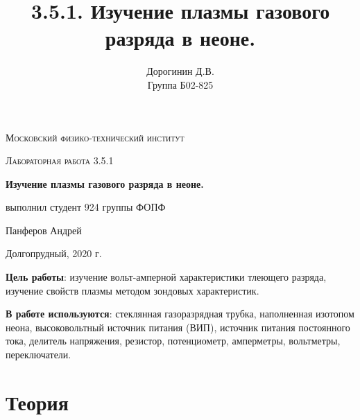 \documentclass[a4paper,12pt]{article}
\author{Дорогинин Д.В.\\
Группа Б02-825}
\title{3.5.1. Изучение плазмы газового разряда в неоне.}
\date{}
\begin{document}
\begin{titlepage}
	\centering
	\vspace{5cm}
	{\scshape\LARGE Московский физико-технический институт \par}
	\vspace{4cm}
	{\scshape\Large Лабораторная работа 3.5.1 \par}
	\vspace{1cm}
	{\huge\bfseries Изучение плазмы газового разряда в неоне. \par}
	\vspace{1cm}
	\vfill
\begin{flushright}
	{\large выполнил студент 924 группы ФОПФ}\par
	\vspace{0.3cm}
	{\LARGE Панферов Андрей}
\end{flushright}
	

	\vfill

	Долгопрудный, 2020 г.
\end{titlepage}

\textbf{Цель работы}: изучение вольт-амперной характеристики тлеющего разряда, изучение свойств плазмы методом зондовых характеристик.


\textbf{В работе используются}: стеклянная газоразрядная трубка, наполненная изотопом неона, высоковольтный источник питания (ВИП), источник питания постоянного тока, делитель напряжения, резистор, потенциометр, амперметры, вольтметры, переключатели.
\section*{Теория}
\end{document}
